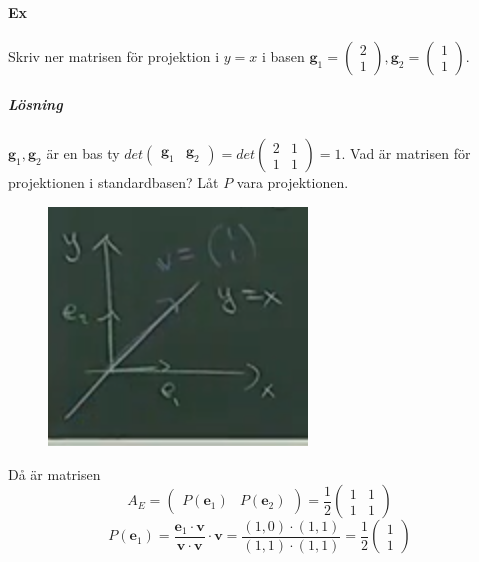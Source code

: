 \paragraph{Ex} Skriv ner matrisen för projektion i $y=x$ i basen $\bm{g}_1=\begin{pmatrix}2\\1\end{pmatrix},\bm{g}_2=\begin{pmatrix}1\\1\end{pmatrix}$.
\subparagraph{Lösning} $\bm{g}_1,\bm{g}_2$ är en bas ty 
$det\begin{pmatrix}\bm{g}_1&\bm{g}_2\end{pmatrix}=det\begin{pmatrix}2&1\\1&1\end{pmatrix}=1$.
Vad är matrisen för projektionen i standardbasen?
Låt $P$ vara projektionen.
\begin{figure}
    \centering
    \includegraphics[scale=0.8]{imgs/img01.png}
\end{figure}
Då är matrisen 
\begin{equation*}
    A_E=\begin{pmatrix}P(\bm{e}_1)&P(\bm{e}_2)\end{pmatrix}=\frac{1}{2}\begin{pmatrix}1&1\\1&1\end{pmatrix}
\end{equation*}
\begin{equation*}
    P(\bm{e}_1)=\frac{\bm{e}_1\cdot \bm{v}}{\bm{v}\cdot \bm{v}}\cdot\bm{v}=\frac{(1,0)\cdot (1,1)}{(1,1)\cdot (1,1)}=\frac{1}{2}\begin{pmatrix}1\\1\end{pmatrix}
\end{equation*}
